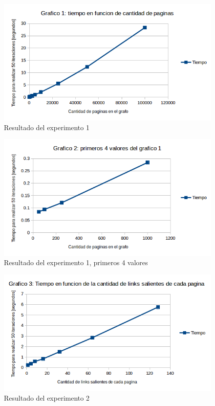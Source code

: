 \FloatBarrier
\begin{figure}[ht]
\begin{center}
\includegraphics[width=0.8\columnwidth]{imagenes/graf1}
\caption{Resultado del experimento 1}
\label{fig:res1}
\end{center}
\end{figure}

\begin{figure}[ht]
\begin{center}
\includegraphics[width=0.8\columnwidth]{imagenes/graf2}
\caption{Resultado del experimento 1, primeros 4 valores}
\label{fig:res1zoom}
\end{center}
\end{figure}

\begin{figure}[ht]
\begin{center}
\includegraphics[width=0.8\columnwidth]{imagenes/graf3}
\caption{Resultado del experimento 2}
\label{fig:res2}
\end{center}
\end{figure}

